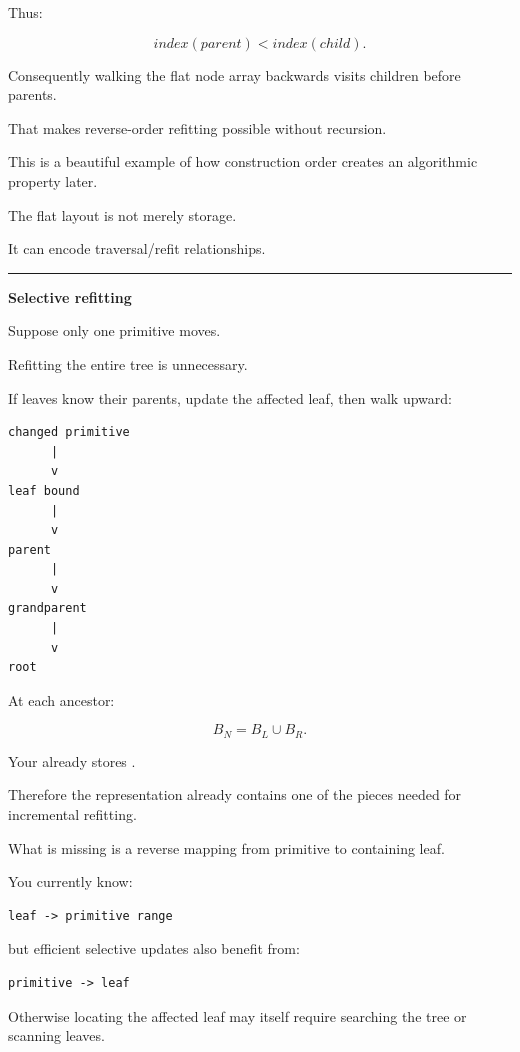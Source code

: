 Thus:

\[
index(parent)<index(child).
\]

Consequently walking the flat node array backwards visits children before parents.

That makes reverse-order refitting possible without recursion.

This is a beautiful example of how construction order creates an algorithmic property later.

The flat layout is not merely storage.

It can encode traversal/refit relationships.

\begin{center}\rule{0.5\linewidth}{0.5pt}\end{center}

\textbf{Selective refitting}

Suppose only one primitive moves.

Refitting the entire tree is unnecessary.

If leaves know their parents, update the affected leaf, then walk upward:

\begin{verbatim}
changed primitive
      |
      v
leaf bound
      |
      v
parent
      |
      v
grandparent
      |
      v
root
\end{verbatim}

At each ancestor:

\[
B_N=
B_L\cup B_R.
\]

Your  already stores .

Therefore the representation already contains one of the pieces needed for incremental refitting.

What is missing is a reverse mapping from primitive to containing leaf.

You currently know:

\begin{verbatim}
leaf -> primitive range
\end{verbatim}

but efficient selective updates also benefit from:

\begin{verbatim}
primitive -> leaf
\end{verbatim}

Otherwise locating the affected leaf may itself require searching the tree or scanning leaves.

